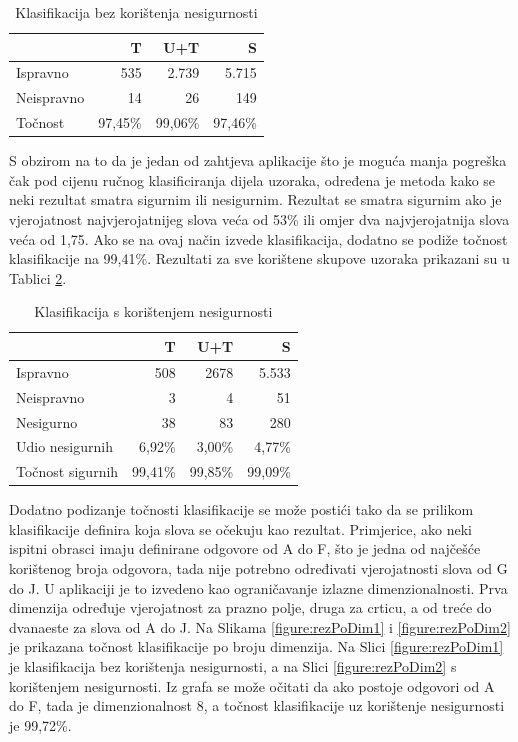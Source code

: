 \documentclass[a4paper,twocolumn,dvipdfm]{article}
\begin{document}
\begin{table}[htb]
\centering
\begin{tabular}{lrrr} \toprule
 & T & U+T & S \\ \midrule
Ispravno & 535 & 2.739 & 5.715 \\
Neispravno & 14 & 26 & 149 \\
Točnost & 97,45\% & 99,06\% & 97,46\% \\ \bottomrule
\end{tabular}
\caption{Klasifikacija bez korištenja nesigurnosti}
\label{table:rezultati}
\end{table}

S obzirom na to da je jedan od zahtjeva aplikacije što je moguća manja pogreška
čak pod cijenu ručnog klasificiranja dijela uzoraka, određena je metoda
kako se neki rezultat smatra sigurnim ili nesigurnim. Rezultat se smatra
sigurnim ako je vjerojatnost najvjerojatnijeg slova veća od 53\% ili omjer dva
najvjerojatnija slova veća od 1,75. Ako se na ovaj način izvede klasifikacija,
dodatno se podiže točnost klasifikacije na 99,41\%. Rezultati za sve korištene
skupove uzoraka prikazani su u Tablici \ref{table:rezultati2}.

\begin{table}[htb]
\centering
\begin{tabular}{lrrr} \toprule
 & T & U+T & S \\ \midrule
Ispravno & 508 & 2678 & 5.533 \\
Neispravno & 3 & 4 & 51 \\
Nesigurno & 38 & 83 & 280 \\
Udio nesigurnih & 6,92\% & 3,00\% & 4,77\% \\
Točnost sigurnih & 99,41\% & 99,85\% & 99,09\% \\ \bottomrule
\end{tabular}
\caption{Klasifikacija s korištenjem nesigurnosti}
\label{table:rezultati2}
\end{table}

Dodatno podizanje točnosti klasifikacije se može postići tako da se prilikom
klasifikacije definira koja slova se očekuju kao rezultat. Primjerice, ako neki
ispitni obrasci imaju definirane odgovore od A do F, što je jedna od najčešće
korištenog broja odgovora, tada nije potrebno određivati vjerojatnosti slova od
G do J. U aplikaciji je to izvedeno kao ograničavanje izlazne dimenzionalnosti.
Prva dimenzija određuje vjerojatnost za prazno polje, druga za crticu, a od
treće do dvanaeste za slova od A do J. Na Slikama \ref{figure:rezPoDim1} i
\ref{figure:rezPoDim2} je prikazana točnost klasifikacije po broju dimenzija. Na
Slici \ref{figure:rezPoDim1} je klasifikacija bez korištenja nesigurnosti, a na
Slici \ref{figure:rezPoDim2} s korištenjem nesigurnosti. Iz grafa se može
očitati da ako postoje odgovori od A do F, tada je dimenzionalnost 8, a točnost
klasifikacije uz korištenje nesigurnosti je 99,72\%.
\end{document}
